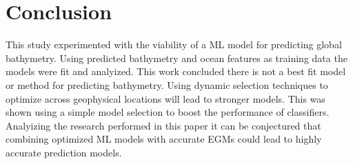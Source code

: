 \section{Conclusion}
\setlength{\parindent}{10ex}
This study experimented with the viability of a \ac{ML} model for predicting global bathymetry.
Using predicted bathymetry and ocean features as training data the models were fit and analyized.
This work concluded there is not a best fit model or method for predicting bathymetry.
Using dynamic selection techniques to optimize across geophysical locations will lead to stronger models.
This was shown using a simple model selection to boost the performance of classifiers.
Analyizing the research performed in this paper it can be conjectured that combining optimized \ac{ML} models with accurate \ac{EGM}s could lead to highly accurate prediction models.